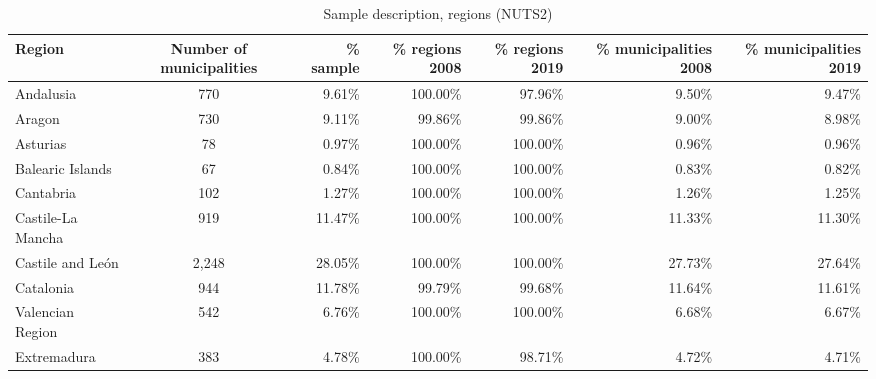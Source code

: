 \documentclass[a4paper,11pt,oneside]{article}
\renewcommand{\baselinestretch}{1.5}
\renewcommand{\baselinestretch}{1.33}
\begin{document}
{\begin{table}
\footnotesize
\renewcommand{\baselinestretch}{1}
\caption{Sample description, regions (NUTS2)}
\centering
\label{tbl:sample_description}
\begin{tabular}{lcrrrrr}
\toprule
\parbox[c]{20mm}{Region}                  & \parbox[c]{20mm}{\centering Number of municipalities}   & \parbox[c]{20mm}{\centering \% sample}   & \parbox[c]{20mm}{\centering \% regions 2008}  & \parbox[c]{20mm}{\centering \% regions 2019} & \parbox[c]{20mm}{\centering \% municipalities 2008} & \parbox[c]{20mm}{\centering \% municipalities 2019} \\
\midrule
Andalusia              & 770                        & 9.61\%      & 100.00\%       & 97.96\%       & 9.50\%                 & 9.47\%                 \\
Aragon                 & 730                        & 9.11\%      & 99.86\%        & 99.86\%       & 9.00\%                 & 8.98\%                 \\
Asturias               & 78                         & 0.97\%      & 100.00\%       & 100.00\%      & 0.96\%                 & 0.96\%                 \\
Balearic Islands               & 67                         & 0.84\%      & 100.00\%       & 100.00\%      & 0.83\%                 & 0.82\%                 \\
Cantabria              & 102                        & 1.27\%      & 100.00\%       & 100.00\%      & 1.26\%                 & 1.25\%                 \\
Castile-La Mancha     & 919                        & 11.47\%     & 100.00\%       & 100.00\%      & 11.33\%                & 11.30\%                \\
Castile and León        & 2,248                       & 28.05\%     & 100.00\%       & 100.00\%      & 27.73\%                & 27.64\%                \\
Catalonia               & 944                        & 11.78\%     & 99.79\%        & 99.68\%       & 11.64\%                & 11.61\%                \\
Valencian Region  & 542                        & 6.76\%      & 100.00\%       & 100.00\%      & 6.68\%                 & 6.67\%                 \\
Extremadura            & 383                        & 4.78\%      & 100.00\%       & 98.71\%       & 4.72\%                 & 4.71\%                 \\

\end{tabular}
\end{table}}
\end{document}
